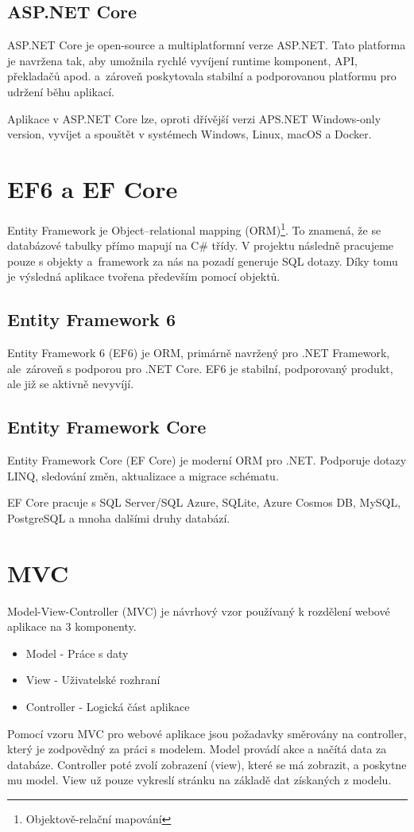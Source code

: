 \documentclass[a4paper, 12pt]{report}
\begin{document}
			\subsection{ASP.NET Core}
            ASP.NET Core je open-source a multiplatformní verze ASP.NET. Tato platforma je navržena tak, aby umožnila rychlé vyvíjení runtime komponent, API, překladačů apod. a~zároveň poskytovala stabilní a podporovanou platformu pro udržení běhu aplikací.\par
			Aplikace v ASP.NET Core lze, oproti dřívější verzi APS.NET Windows-only version, vyvíjet a spouštět v systémech Windows, Linux, macOS a Docker.\cite{ASP.NET_Core}

		\section{EF6 a EF Core}
        Entity Framework je Object–relational mapping (ORM)\footnote{Objektově-relační mapování}. To znamená, že se databázové tabulky přímo mapují na C\# třídy. V projektu následně pracujeme pouze s objekty a~framework za nás na pozadí generuje SQL dotazy. Díky tomu je výsledná aplikace tvořena především pomocí objektů.\cite{ASP.NET_Lekce8}
			\subsection{Entity Framework 6}
            Entity Framework 6 (EF6) je ORM, primárně navržený pro .NET Framework, ale~zároveň s podporou pro .NET Core. EF6 je stabilní, podporovaný produkt, ale již se aktivně nevyvíjí.\cite{EF6_EFCore}
			\subsection{Entity Framework Core}
			Entity Framework Core (EF Core) je moderní ORM pro .NET. Podporuje dotazy LINQ, sledování změn, aktualizace a migrace schématu.\par EF Core pracuje s SQL Server/SQL Azure, SQLite, Azure Cosmos DB, MySQL, PostgreSQL a mnoha dalšími druhy databází.\cite{EF6_EFCore}

		\section{MVC}
		Model-View-Controller (MVC) je návrhový vzor používaný k rozdělení webové aplikace na 3 komponenty.
		\begin{itemize}
			\item Model - Práce s daty
			\item View - Uživatelské rozhraní
			\item Controller - Logická část aplikace
		\end{itemize}\par
		Pomocí vzoru MVC pro webové aplikace jsou požadavky směrovány na controller, který je zodpovědný za práci s modelem. Model provádí akce a načítá data za databáze. Controller poté zvolí zobrazení (view), které se má zobrazit, a poskytne mu model. View už pouze vykreslí stránku na základě dat získaných z modelu.\cite{MVC}
\end{document}
